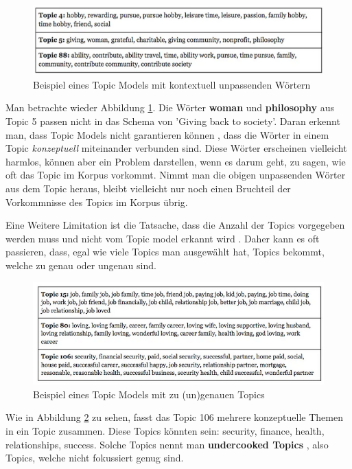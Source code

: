 \begin{figure}
    \centering
    \includegraphics[scale=0.6]{images/dlengsteiner/example-topic-modeling-1}
    \caption{Beispiel eines Topic Models mit kontextuell unpassenden Wörtern}
    \label{fig:example-topic-modeling-1}
\end{figure}
Man betrachte wieder Abbildung \ref{fig:example-topic-modeling-1}. Die Wörter \textbf{woman} und \textbf{philosophy} aus Topic 5 passen nicht in das Schema von 'Giving back to society'. Daran erkennt man, dass Topic Models nicht garantieren können \cite{sense-topic-modelling-van-kessel}, dass die Wörter in einem Topic \textit{konzeptuell} miteinander verbunden sind. Diese Wörter erscheinen vielleicht harmlos, können aber ein Problem darstellen, wenn es darum geht, zu sagen, wie oft das Topic im Korpus vorkommt. Nimmt man die obigen unpassenden Wörter aus dem Topic heraus, bleibt vielleicht nur noch einen Bruchteil der Vorkommnisse des Topics im Korpus übrig.

Eine Weitere Limitation ist die Tatsache, dass die Anzahl der Topics vorgegeben werden muss und nicht vom Topic model erkannt wird \cite{sense-topic-modelling-van-kessel}. Daher kann es oft passieren, dass, egal wie viele Topics man ausgewählt hat, Topics bekommt, welche zu genau oder ungenau sind.

\begin{figure}
    \centering
    \includegraphics[scale=0.6]{images/dlengsteiner/example-topic-modeling-2}
    \caption{Beispiel eines Topic Models mit zu (un)genauen Topics}
    \label{fig:example-topic-modeling-2}
\end{figure}
Wie in Abbildung \ref{fig:example-topic-modeling-2} zu sehen, fasst das Topic 106 mehrere konzeptuelle Themen in ein Topic zusammen. Diese Topics könnten sein: security, finance, health, relationships, success. Solche Topics nennt man \textbf{undercooked Topics} \cite{sense-topic-modelling-van-kessel}, also Topics, welche nicht fokussiert genug sind.

